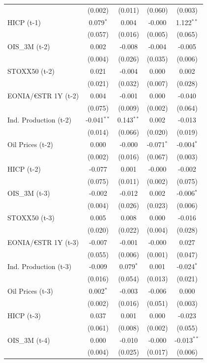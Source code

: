 \begin{longtable}[t]{lcccc}
 & (0.002) & (0.011) & (0.060) & (0.003)\\
HICP (t-1) & 0.079$^{*}$ & 0.004 & -0.000 & 1.122$^{**}$\\
 & (0.057) & (0.016) & (0.005) & (0.065)\\
OIS\_3M (t-2) & 0.002 & -0.008 & -0.004 & -0.005\\
 & (0.004) & (0.026) & (0.035) & (0.006)\\
STOXX50 (t-2) & 0.021 & -0.004 & 0.000 & 0.002\\
 & (0.021) & (0.032) & (0.007) & (0.028)\\
EONIA/€STR 1Y (t-2) & 0.004 & -0.001 & 0.000 & -0.040\\
 & (0.075) & (0.009) & (0.002) & (0.064)\\
Ind. Production (t-2) & -0.041$^{**}$ & 0.143$^{**}$ & 0.002 & -0.013\\
 & (0.014) & (0.066) & (0.020) & (0.019)\\
Oil Prices (t-2) & 0.000 & -0.000 & -0.071$^{*}$ & -0.004$^{*}$\\
 & (0.002) & (0.016) & (0.067) & (0.003)\\
HICP (t-2) & -0.077 & 0.001 & -0.000 & -0.002\\
 & (0.075) & (0.011) & (0.002) & (0.075)\\
OIS\_3M (t-3) & -0.002 & -0.012 & 0.002 & -0.006$^{*}$\\
 & (0.004) & (0.026) & (0.023) & (0.006)\\
STOXX50 (t-3) & 0.005 & 0.008 & 0.000 & -0.016\\
 & (0.020) & (0.022) & (0.004) & (0.028)\\
EONIA/€STR 1Y (t-3) & -0.007 & -0.001 & -0.000 & 0.027\\
 & (0.055) & (0.006) & (0.001) & (0.047)\\
Ind. Production (t-3) & -0.009 & 0.079$^{*}$ & 0.001 & -0.024$^{*}$\\
 & (0.016) & (0.054) & (0.013) & (0.021)\\
Oil Prices (t-3) & 0.002$^{*}$ & -0.003 & -0.006 & 0.000\\
 & (0.002) & (0.016) & (0.051) & (0.003)\\
HICP (t-3) & 0.037 & 0.001 & 0.000 & -0.023\\
 & (0.061) & (0.008) & (0.002) & (0.055)\\
OIS\_3M (t-4) & 0.000 & -0.010 & -0.000 & -0.013$^{**}$\\
 & (0.004) & (0.025) & (0.017) & (0.006)\\

\end{longtable}
